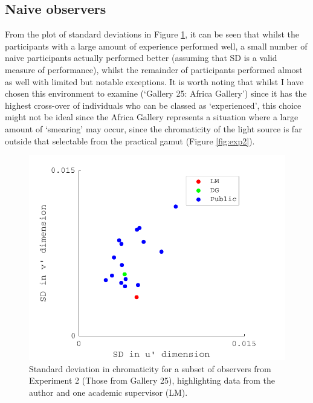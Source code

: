 
\subsection{Naive observers}

From the plot of standard deviations in Figure \ref{fig:naive}, it can be seen that whilst the participants with a large amount of experience performed well, a small number of naive participants actually performed better (assuming that SD is a valid measure of performance), whilst the remainder of participants performed almost as well with limited but notable exceptions. It is worth noting that whilst I have chosen this environment to examine (`Gallery 25: Africa Gallery') since it has the highest cross-over of individuals who can be classed as `experienced', this choice might not be ideal since the Africa Gallery represents a situation where a large amount of `smearing' may occur, since the chromaticity of the light source is far outside that selectable from the practical gamut (Figure \ref{fig:exp2}). 

\begin{figure}[hbtp]
\includegraphics[max width=\textwidth]{figs/tablet/naive.pdf} 
\caption{Standard deviation in chromaticity for a subset of observers from Experiment 2 (Those from Gallery 25), highlighting data from the author and one academic supervisor (LM).}
\label{fig:naive}
\end{figure}

